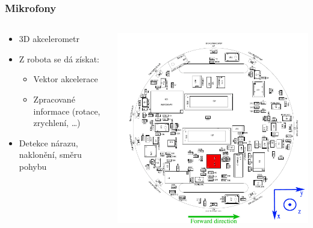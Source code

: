 \documentclass{beamer}
\begin{document}
\begin{frame}
    \frametitle{Mikrofony}
    \begin{columns}
        \begin{column}{0.6\textwidth}
            \begin{itemize}
                \item 3D akcelerometr
                \item Z robota se dá získat:
                    \begin{itemize}
                        \item Vektor akcelerace
                        \item Zpracované informace (rotace, zrychlení, \ldots)
                    \end{itemize}
                \item Detekce nárazu, naklonění, směru pohybu
            \end{itemize}
        \end{column}

        \begin{column}{0.4\textwidth}
            \includegraphics[scale=0.2]{acc_emplacement.png}
        \end{column}
    \end{columns}
\end{frame}
\end{document}
